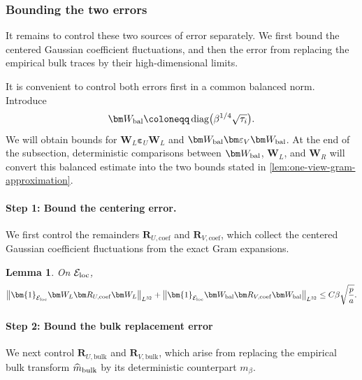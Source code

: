\documentclass[11pt]{article}
\newtheorem{lemma}{Lemma}
\newcommand{\ind}{\bm{1}}
\DeclareMathOperator{\diag}{diag}
\newcommand{\Lqn}[2]{\left\lVert #1\right\rVert_{L^{#2}}}
\newcommand{\cE}{\mathcal{E}}
\begin{document}
\subsubsection{Bounding the two errors}


It remains to control these two sources of error
separately.  We first bound the centered Gaussian coefficient fluctuations,
and then the error from replacing the empirical bulk traces by their
high-dimensional limits.



It is convenient to control both errors first in a common balanced norm.
Introduce
\[
\bm W_{\rm bal} \coloneqq \diag\bigl( \beta^{1/4}\sqrt{\tau_i} \bigr).
\]
We will obtain bounds for
$\bm W_L\bm\varepsilon_U\bm W_L$ and
$\bm W_{\rm bal}\bm\varepsilon_V\bm W_{\rm bal}$.
At the end of the subsection, deterministic comparisons between
$\bm W_{\rm bal}$, $\bm W_L$, and $\bm W_R$ will convert this balanced estimate
into the two bounds stated in \cref{lem:one-view-gram-approximation}.

\paragraph{Step 1: Bound the centering error. }

We first control the remainders
$\bm R_{U,\mathrm{coef}}$ and $\bm R_{V,\mathrm{coef}}$, which collect the
centered Gaussian coefficient fluctuations from the exact Gram expansions.

\begin{lemma}
\label{lem:one-view-coefficient-error}
On $\cE_{\rm loc}$,
\begin{equation}
\label{eq:one-view-coefficient-error-master}
  \Lqn{
    \ind_{\cE_{\rm loc}}
    \bm W_L\bm R_{U,\mathrm{coef}}\bm W_L
  }{32}
  +
  \Lqn{
    \ind_{\cE_{\rm loc}}
    \bm W_{\rm bal}\bm R_{V,\mathrm{coef}}\bm W_{\rm bal}
  }{32}
  \le
  C\beta \sqrt{\frac{p}{a}}.
\end{equation}
\end{lemma}




\paragraph{Step 2: Bound the bulk replacement error}

We next control
$\bm R_{U,\mathrm{bulk}}$ and $\bm R_{V,\mathrm{bulk}}$,
which arise from replacing the empirical bulk transform
$\widehat m_{\rm bulk}$ by its deterministic counterpart $m_\beta$.
\end{document}
